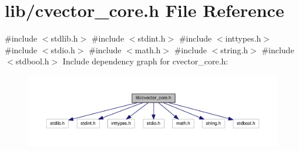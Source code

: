 \section{lib/cvector\+\_\+core.h File Reference}
\label{cvector__core_8h}
{\ttfamily \#include $<$stdlib.\+h$>$}\newline
{\ttfamily \#include $<$stdint.\+h$>$}\newline
{\ttfamily \#include $<$inttypes.\+h$>$}\newline
{\ttfamily \#include $<$stdio.\+h$>$}\newline
{\ttfamily \#include $<$math.\+h$>$}\newline
{\ttfamily \#include $<$string.\+h$>$}\newline
{\ttfamily \#include $<$stdbool.\+h$>$}\newline
Include dependency graph for cvector\+\_\+core.\+h\+:
\nopagebreak
\begin{figure}[H]
\begin{center}
\leavevmode
\includegraphics[width=350pt]{cvector__core_8h__incl}
\end{center}
\end{figure}
